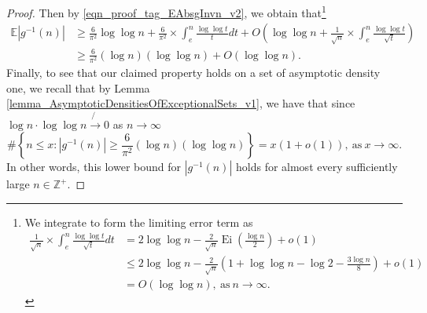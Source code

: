 \documentclass[11pt,reqno,a4letter]{article}
\numberwithin{figure}{section}
\numberwithin{table}{section}
\theoremstyle{plain}
\numberwithin{theorem}{section}
\theoremstyle{definition}
\begin{document}
\begin{proof}
Then by \eqref{eqn_proof_tag_EAbsgInvn_v2}, we obtain that\footnote{ 
     We integrate to form the limiting error term as 
     \begin{align*} 
     \frac{1}{\sqrt{n}} \times \int_{e}^{n} \frac{\log\log t}{\sqrt{t}} dt & = 
          2 \log\log n - \frac{2}{\sqrt{n}} \operatorname{Ei}\left(\frac{\log n}{2}\right) + o(1) \\ 
          & \leq 2 \log\log n - \frac{2}{\sqrt{n}} \left(1 + \log\log n - \log 2 - \frac{3\log n}{8} 
          \right) + o(1) \\ 
          & = O(\log\log n), \mathrm{\ as\ } n \rightarrow \infty. 
     \end{align*} 
}
\begin{align*} 
\mathbb{E}|g^{-1}(n)| & \geq \frac{6}{\pi^2} \log\log n + \frac{6}{\pi^2} \times \int_{e}^{n} 
     \frac{\log\log t}{t} dt + 
     O\left(\log\log n + \frac{1}{\sqrt{n}} \times \int_{e}^{n} \frac{\log\log t}{\sqrt{t}}\right) \\ 
     & \geq \frac{6}{\pi^2} (\log n) (\log\log n) + O(\log\log n). 
\end{align*} 
Finally, to see that our claimed property 
holds on a set of asymptotic density one, we recall that by 
Lemma \ref{lemma_AsymptoticDensitiesOfExceptionalSets_v1}, 
we have that since $\log n \cdot \log\log n \not{\rightarrow} 0$ as $n \rightarrow \infty$ 
\begin{equation} 
\label{eqn_proof_tag_DensityOfgInvnNearExpectation_v3} 
\#\left\{n \leq x: |g^{-1}(n)| \geq \frac{6}{\pi^2} (\log n) (\log\log n)\right\} = 
     x(1 + o(1)), \mathrm{\ as\ } x \rightarrow \infty. 
\end{equation} 
In other words, this lower bound for $|g^{-1}(n)|$ holds for almost every 
sufficiently large $n \in \mathbb{Z}^{+}$. 
\end{proof} 
\end{document}
